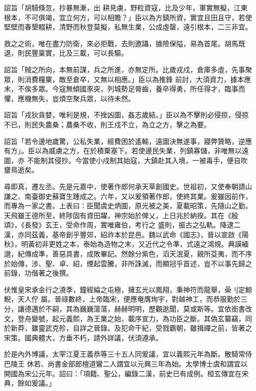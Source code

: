 \begin{pinyinscope}
 詔旨「胡騎倏忽，抄暴無漸，出
 耕見虜，野粒資寇，比及少年，軍實無擬，江東根本，不可俱竭，宜立何方，可以相贍？」臣以為方鎮所資，實宜且田且守，若使堅壁而春墾輟耕，清野而秋登莫擬，私無生業，公成虛罄，遠引根本，二三非宜。



 救之之術，唯在盡力防衛，來必拒戰，去則邀躡，據險保隘，易為首尾。胡馬既退，則民豐稟實，比及三載，可以長驅。



 詔旨「賊之所向，本無前謀，兵之所進，亦無定所。比歲戎戍，倉庫多虛，先事聚眾，則消費糧粟，敵至倉卒，又無以相應。」臣以為推鋒
 前討，大須資力，據本應末，不俟多眾。今寇無傾國豕突，列城勢足脣齒，養卒得勇，所任得才，臨事而懼，應機無失，豈煩空聚兵眾，以待未然。



 詔旨「戎狄貪婪，唯利是規，不挫凶圖，姦志歲結。」臣以為不擊則必侵掠，侵掠不已，則民失農桑；農桑不收，則王戍不立，為立之方，擊之為要。



 詔旨「若令邊地歲驚，公私失業，經費困於遙輸，遠圖決無遂事，寢弊贊略，逆應有方」。臣以為威虜之方，在於積粟塞下。若使邊民失業，列鎮寡儲，非唯無以遠圖，亦
 不能制其侵抄。今當使小戍制其始寇，大鎮赴其入境，一被毒手，便自吹齏鳥逝矣。



 尋即真，遷左丞。先是元嘉中，使著作郎何承天草創國史。世祖初，又使奉朝請山謙之、南臺御史蘇寶生踵成之。六年，又以爰領著作郎，使終其業。爰雖因前作，而專為一家之書。上表曰：臣聞虞史炳圖，原光被之美，夏載昭策，先隨山之勤。天飛雖王德所至，終陟固有資田躍，神宗始於俾乂，上日兆於納揆。其在《殷頌》，《長發》玄王，受命作周，實唯雍伯，考行之
 盛則，振古之弘軌。降逮二漢，亦同茲義，基帝創乎豐郊，紹祚本於昆邑。魏以武命《國志》，晉以宣啟《陽秋》，明黃初非更姓之本，泰始為造物之末，又近代之令準，式遠之鴻規。典謨緬邈，紀傳成準，善惡具書，成敗畢記。然餘分紫色，滔天泯夏，親所芟夷，而不序於始傳，涉、聖、卓、紹，煙起雲騰，非所誅滅，而顯冠乎首述，豈不以事先歸之前錄，功偕著之後撰。



 伏惟皇宋承金行之澆季，鐘經綸之屯極，擁玄光以鳳翔，秉神符而龍舉，喿刂定鯨鯢，天人佇
 屬。晉祿數終，上帝臨宋，便應奄膺珣宇，對越神工，而恭服勤於三分，讓德邁於不嗣，其為巍巍蕩蕩，赫赫明明，歷觀逖聞，莫或斯等。宜依銜書改文，登舟變號，起元義熙，為王業之始，載序宣力，為功臣之斷。其偽玄纂竊，同於新莽，雖靈武克殄，自詳之晉錄。及犯命干紀，受戮霸朝，雖揖禪之前，皆著之宋策。國典體大，方垂不朽，請外詳議，伏須遵承。



 於是內外博議，太宰江夏王義恭等三十五人同爰議，宜以義熙元年為斷。散騎常侍巴陵王
 休若、尚書金部郎檀道鸞二人謂宜以元興三年為始。太學博士虞和謂宜以開國為宋公元年。詔曰：「項籍、聖公，編錄二漢，前史已有成例。桓玄傳宜在宋典，餘如爰議。」




\end{pinyinscope}
